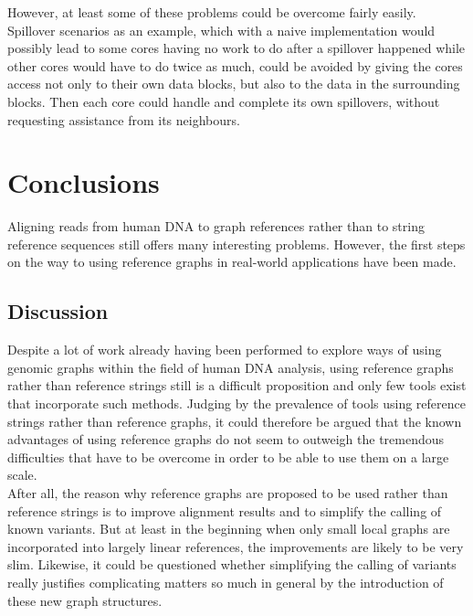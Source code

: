 \documentclass[a4paper,12pt,twoside,BCOR=10mm]{scrbook}
\begin{document}
However, at least some of these problems could be overcome fairly easily.
Spillover scenarios as an example, which with a naive
implementation would possibly lead to some cores having no work to do
after a spillover happened while other cores would have to do twice as much,
could be avoided by giving the cores access not only to their own data blocks,
but also to the data in the surrounding blocks. Then each core could handle
and complete its own spillovers, without requesting assistance from its neighbours.

\chapter{Conclusions}
%

Aligning reads from human DNA to graph references rather than to string reference sequences
still offers many interesting problems.
However, the first steps on the way to using reference graphs in real-world applications have been made.

\section{Discussion}

Despite a lot of work already having been performed to explore
ways of using genomic graphs within the field of human DNA analysis,
using reference graphs rather than reference strings still
is a difficult proposition and only few tools exist that incorporate
such methods.
Judging by the prevalence of tools using reference strings rather than reference graphs, 
it could therefore be argued that the known advantages of using reference
graphs do not seem to outweigh the tremendous difficulties that have to
be overcome in order to be able to use them on a large scale. \\
After all, the reason why reference graphs are proposed to be used
rather than reference strings is to improve alignment results
and to simplify the calling of known variants.
But at least in the beginning when only small local graphs are incorporated
into largely linear references, the improvements are likely to be very slim.
Likewise, it could be questioned whether simplifying the calling of variants really
justifies complicating matters so much in general by the introduction of
these new graph structures.
\end{document}
